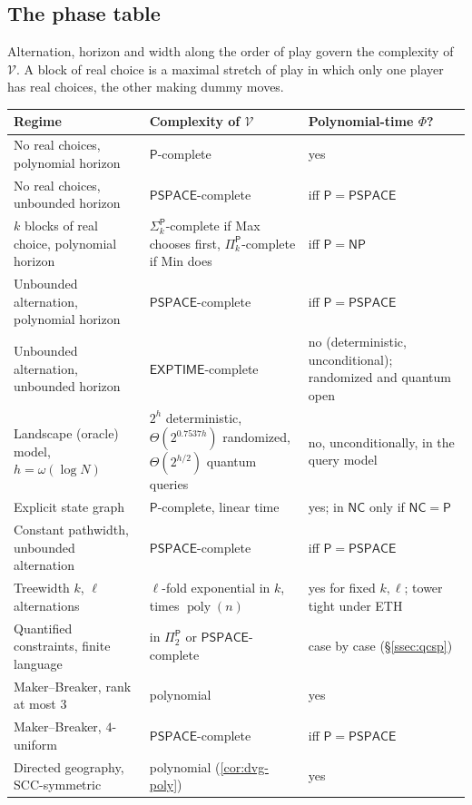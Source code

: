 \documentclass[11pt]{amsart}
\theoremstyle{plain}
\theoremstyle{definition}
\theoremstyle{remark}
\numberwithin{equation}{section}
\newcommand{\val}{\mathcal{V}}            %
\newcommand{\poly}{\operatorname{poly}}
\newcommand{\cls}[1]{\mathsf{#1}}
\newcommand{\PSPACE}{\cls{PSPACE}}
\newcommand{\EXPTIME}{\cls{EXPTIME}}
\newcommand{\NP}{\cls{NP}}
\newcommand{\Pclass}{\cls{P}}
\newcommand{\NC}{\cls{NC}}
\begin{document}
\subsection{The phase table}\label{ssec:phase}
Alternation, horizon and width along the order of play govern the complexity of $\val$. A block of real choice is a maximal stretch of play in which only one player has real choices, the other making dummy moves.

\begin{center}
\small
\begin{longtable}{@{}L{0.36}L{0.32}L{0.25}@{}}
\toprule
Regime & Complexity of $\val$ & Polynomial-time $\Phi$?\\ \midrule\endhead
No real choices, polynomial horizon & $\Pclass$-complete & yes\\
No real choices, unbounded horizon & $\PSPACE$-complete & iff $\Pclass=\PSPACE$\\
$k$ blocks of real choice, polynomial horizon & $\Sigma_k^{\Pclass}$-complete if Max chooses first, $\Pi_k^{\Pclass}$-complete if Min does & iff $\Pclass=\NP$\\
Unbounded alternation, polynomial horizon & $\PSPACE$-complete & iff $\Pclass=\PSPACE$\\
Unbounded alternation, unbounded horizon & $\EXPTIME$-complete & no (deterministic, unconditional); randomized and quantum open\\
Landscape (oracle) model, $h=\omega(\log N)$ & $2^h$ deterministic, $\Theta(2^{0.7537h})$ randomized, $\Theta(2^{h/2})$ quantum queries & no, unconditionally, in the query model\\
Explicit state graph & $\Pclass$-complete, linear time & yes; in $\NC$ only if $\NC=\Pclass$\\
Constant pathwidth, unbounded alternation & $\PSPACE$-complete & iff $\Pclass=\PSPACE$\\
Treewidth $k$, $\ell$ alternations & $\ell$-fold exponential in $k$, times $\poly(n)$ & yes for fixed $k,\ell$; tower tight under ETH\\
Quantified constraints, finite language & in $\Pi_2^{\Pclass}$ or $\PSPACE$-complete & case by case (\S\ref{ssec:qcsp})\\
Maker--Breaker, rank at most $3$ & polynomial & yes\\
Maker--Breaker, $4$-uniform & $\PSPACE$-complete & iff $\Pclass=\PSPACE$\\
Directed geography, SCC-symmetric & polynomial (\cref{cor:dvg-poly}) & yes\\

\end{longtable}
\end{center}
\end{document}
